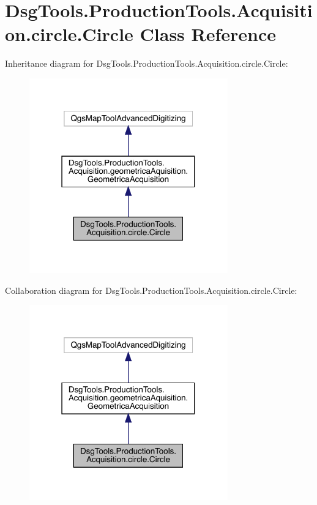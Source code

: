 \hypertarget{class_dsg_tools_1_1_production_tools_1_1_acquisition_1_1circle_1_1_circle}{}\section{Dsg\+Tools.\+Production\+Tools.\+Acquisition.\+circle.\+Circle Class Reference}
\label{class_dsg_tools_1_1_production_tools_1_1_acquisition_1_1circle_1_1_circle}


Inheritance diagram for Dsg\+Tools.\+Production\+Tools.\+Acquisition.\+circle.\+Circle\+:
\nopagebreak
\begin{figure}[H]
\begin{center}
\leavevmode
\includegraphics[width=243pt]{class_dsg_tools_1_1_production_tools_1_1_acquisition_1_1circle_1_1_circle__inherit__graph}
\end{center}
\end{figure}


Collaboration diagram for Dsg\+Tools.\+Production\+Tools.\+Acquisition.\+circle.\+Circle\+:
\nopagebreak
\begin{figure}[H]
\begin{center}
\leavevmode
\includegraphics[width=243pt]{class_dsg_tools_1_1_production_tools_1_1_acquisition_1_1circle_1_1_circle__coll__graph}
\end{center}
\end{figure}
